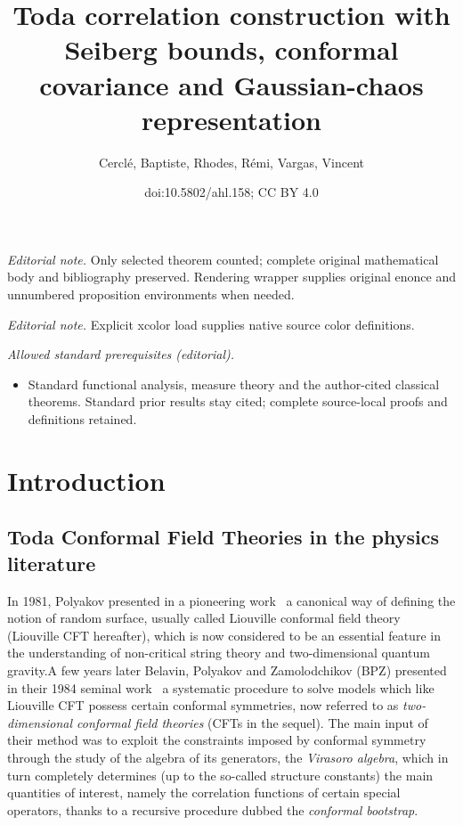\documentclass[10pt]{amsart}
\title{Toda correlation construction with Seiberg bounds, conformal covariance and Gaussian-chaos representation}
\author{Cerclé, Baptiste, Rhodes, Rémi, Vargas, Vincent}
\date{doi:10.5802/ahl.158; CC BY 4.0}
\theoremstyle{definition}\newtheorem{defi}[theo]{Definition}\newtheorem{rema}[theo]{Remark}\newtheorem{exam}[theo]{Example}\newtheorem{exem}[theo]{Example}\newtheorem{nota}[theo]{Notation}
\begin{document}
\maketitle
\noindent\textit{Editorial note.} Only selected theorem counted; complete original mathematical body and bibliography preserved. Rendering wrapper supplies original enonce and unnumbered proposition environments when needed.\par\medskip
\noindent\textit{Editorial note.} Explicit xcolor load supplies native source color definitions.\par\medskip
\noindent\textit{Allowed standard prerequisites (editorial).}\begin{itemize}
\item Standard functional analysis, measure theory and the author-cited classical theorems. Standard prior results stay cited; complete source-local proofs and definitions retained.
\end{itemize}\medskip

\section{Introduction}


\subsection{Toda Conformal Field Theories in the physics literature}

In 1981, Polyakov presented in a pioneering work~\cite{Pol81} a canonical way of defining the notion of random surface, usually called Liouville conformal field theory (Liouville CFT hereafter), which is now considered to be an essential feature in the understanding of non-critical string theory and two-dimensional quantum gravity.\linebreak A few years later Belavin, Polyakov and Zamolodchikov (BPZ) presented in their 1984 seminal work~\cite{BPZ} a systematic procedure to solve models which like Liouville CFT possess certain conformal symmetries, now referred to as \emph{two-dimensional conformal field theories} (CFTs in the sequel). The main input of their method was to exploit the constraints imposed by conformal symmetry through the study of the algebra of its generators, the \emph{Virasoro algebra}, which in turn completely determines (up to the so-called structure constants) the main quantities of interest, namely the correlation functions of certain special operators, thanks to a recursive procedure dubbed the \emph{conformal bootstrap}.
\end{document}
